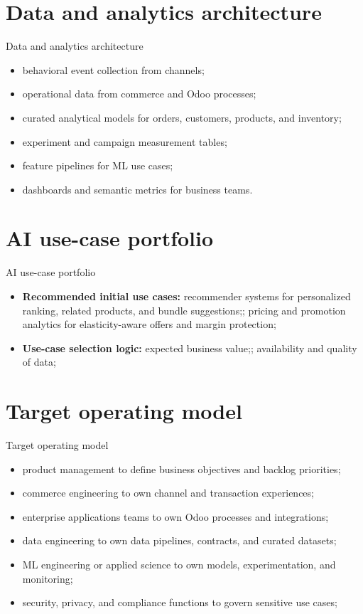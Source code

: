\documentclass[aspectratio=169]{beamer}
\begin{document}
\section{Data and analytics architecture}

\begin{frame}{Data and analytics architecture}
  \begin{itemize}
    \item behavioral event collection from channels;
    \item operational data from commerce and Odoo processes;
    \item curated analytical models for orders, customers, products, and inventory;
    \item experiment and campaign measurement tables;
    \item feature pipelines for ML use cases;
    \item dashboards and semantic metrics for business teams.
  \end{itemize}
\end{frame}

\section{AI use-case portfolio}

\begin{frame}{AI use-case portfolio}
  \begin{itemize}
    \item \textbf{Recommended initial use cases:} recommender systems for personalized ranking, related products, and bundle suggestions;; pricing and promotion analytics for elasticity-aware offers and margin protection;
    \item \textbf{Use-case selection logic:} expected business value;; availability and quality of data;
  \end{itemize}
\end{frame}

\section{Target operating model}

\begin{frame}{Target operating model}
  \begin{itemize}
    \item product management to define business objectives and backlog priorities;
    \item commerce engineering to own channel and transaction experiences;
    \item enterprise applications teams to own Odoo processes and integrations;
    \item data engineering to own data pipelines, contracts, and curated datasets;
    \item ML engineering or applied science to own models, experimentation, and monitoring;
    \item security, privacy, and compliance functions to govern sensitive use cases;
  \end{itemize}
\end{frame}
\end{document}
